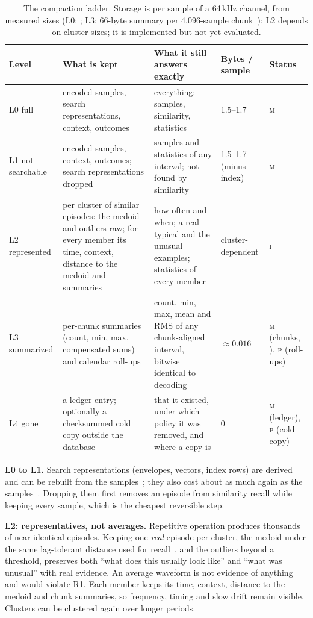 \documentclass[sigconf,nonacm]{acmart}
\newcommand{\meas}{\textsc{m}}
\newcommand{\impl}{\textsc{i}}
\newcommand{\prop}{\textsc{p}}
\begin{document}
\begin{table}[t]
\caption{The compaction ladder. Storage is per sample of a 64\,kHz channel, from measured sizes (L0: \cite{g1,b3}; L3: 66-byte summary per 4,096-sample chunk~\cite{cs1}); L2 depends on cluster sizes; it is implemented but not yet evaluated.}
\label{tab:ladder}
\small
\begin{tabularx}{\textwidth}{@{}lXXll@{}}
\toprule
Level & What is kept & What it still answers exactly & Bytes / sample & Status \\
\midrule
L0 full & encoded samples, search representations, context, outcomes & everything: samples, similarity, statistics & 1.5--1.7 & \meas{} \\
L1 not searchable & encoded samples, context, outcomes; search representations dropped & samples and statistics of any interval; not found by similarity & 1.5--1.7 (minus index) & \meas{}~\cite{f1} \\
L2 represented & per cluster of similar episodes: the medoid and outliers raw; for every member its time, context, distance to the medoid and summaries & how often and when; a real typical and the unusual examples; statistics of every member & cluster-dependent & \impl{} \\
L3 summarized & per-chunk summaries (count, min, max, compensated sums) and calendar roll-ups & count, min, max, mean and RMS of any chunk-aligned interval, bitwise identical to decoding & $\approx 0.016$ & \meas{} (chunks, \cite{f1}), \prop{} (roll-ups) \\
L4 gone & a ledger entry; optionally a checksummed cold copy outside the database & that it existed, under which policy it was removed, and where a copy is & 0 & \meas{}~\cite{f1} (ledger), \prop{} (cold copy) \\
\bottomrule
\end{tabularx}
\end{table}

\textbf{L0 to L1.} Search representations (envelopes, vectors, index rows) are derived and can be rebuilt from the samples~\cite{morletdb}; they also cost about as much again as the samples~\cite{morletdb}. Dropping them first removes an episode from similarity recall while keeping every sample, which is the cheapest reversible step.

\textbf{L2: representatives, not averages.} Repetitive operation produces thousands of near-identical episodes. Keeping one \emph{real} episode per cluster, the medoid under the same lag-tolerant distance used for recall~\cite{kaufman1990}, and the outliers beyond a threshold, preserves both ``what does this usually look like'' and ``what was unusual'' with real evidence. An average waveform is not evidence of anything and would violate R1. Each member keeps its time, context, distance to the medoid and chunk summaries, so frequency, timing and slow drift remain visible. Clusters can be clustered again over longer periods.
\end{document}
